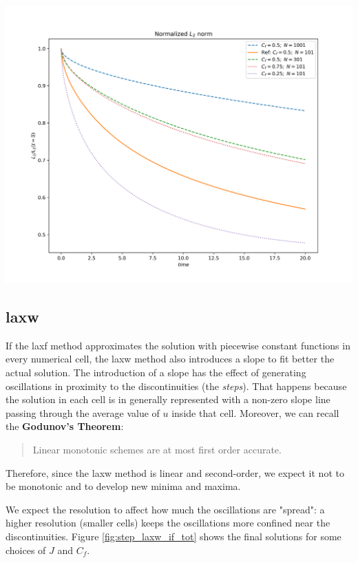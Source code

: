 \documentclass[11pt, a4paper]{article}
\begin{document}
\begin{center}
    \centering
    \includegraphics[width=0.9\linewidth]{images/L2_STEP_LAX-F.png}
    \label{fig:step_laxf_l2_tot}
\end{center}

\subsection{\acrlong{laxw}}

If the \acrshort{laxf} method approximates the solution with piecewise constant functions in every numerical cell, the \acrshort{laxw} method also introduces a slope to fit better the actual solution. The introduction of a slope has the effect of generating oscillations in proximity to the discontinuities (the \textit{steps}). That happens because the solution in each cell is in generally represented with a non-zero slope line passing through the average value of \(u\) inside that cell. Moreover, we can recall the \textbf{Godunov's Theorem}:

\begin{quote}
    Linear monotonic schemes are at most first order accurate.
\end{quote}

\noindent
Therefore, since the \acrshort{laxw} method is linear and second-order, we expect it not to be monotonic and to develop new minima and maxima.

We expect the resolution to affect how much the oscillations are "spread": a higher resolution (smaller cells) keeps the oscillations more confined near the discontinuities. Figure \ref{fig:step_laxw_if_tot} shows the final solutions for some choices of \(J\) and \(C_f\).
\end{document}
